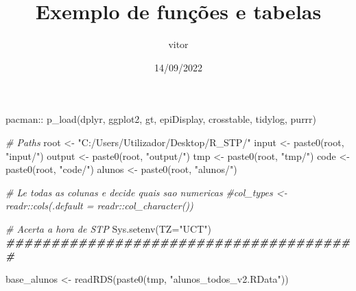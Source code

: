 \documentclass[
]{article}
\title{Exemplo de funções e tabelas}
\author{vitor}
\date{14/09/2022}
\newenvironment{Shaded}{\begin{snugshade}}{\end{snugshade}}
\newcommand{\AttributeTok}[1]{\textcolor[rgb]{0.77,0.63,0.00}{#1}}
\newcommand{\CommentTok}[1]{\textcolor[rgb]{0.56,0.35,0.01}{\textit{#1}}}
\newcommand{\DocumentationTok}[1]{\textcolor[rgb]{0.56,0.35,0.01}{\textbf{\textit{#1}}}}
\newcommand{\FunctionTok}[1]{\textcolor[rgb]{0.00,0.00,0.00}{#1}}
\newcommand{\NormalTok}[1]{#1}
\newcommand{\OtherTok}[1]{\textcolor[rgb]{0.56,0.35,0.01}{#1}}
\newcommand{\SpecialCharTok}[1]{\textcolor[rgb]{0.00,0.00,0.00}{#1}}
\newcommand{\StringTok}[1]{\textcolor[rgb]{0.31,0.60,0.02}{#1}}
\begin{document}
\maketitle

\begin{Shaded}
\begin{Highlighting}[]
\NormalTok{pacman}\SpecialCharTok{::} \FunctionTok{p\_load}\NormalTok{(dplyr, ggplot2, gt, epiDisplay, crosstable, tidylog, purrr)}

\CommentTok{\# Paths}
\NormalTok{root     }\OtherTok{\textless{}{-}}  \StringTok{"C:/Users/Utilizador/Desktop/R\_STP/"}
\NormalTok{input    }\OtherTok{\textless{}{-}} \FunctionTok{paste0}\NormalTok{(root, }\StringTok{"input/"}\NormalTok{)}
\NormalTok{output   }\OtherTok{\textless{}{-}} \FunctionTok{paste0}\NormalTok{(root, }\StringTok{"output/"}\NormalTok{)}
\NormalTok{tmp      }\OtherTok{\textless{}{-}} \FunctionTok{paste0}\NormalTok{(root, }\StringTok{"tmp/"}\NormalTok{)}
\NormalTok{code     }\OtherTok{\textless{}{-}} \FunctionTok{paste0}\NormalTok{(root, }\StringTok{"code/"}\NormalTok{)}
\NormalTok{alunos   }\OtherTok{\textless{}{-}} \FunctionTok{paste0}\NormalTok{(root, }\StringTok{"alunos/"}\NormalTok{)}

\CommentTok{\# Le todas as colunas e decide quais sao numericas}
\CommentTok{\#col\_types \textless{}{-} readr::cols(.default = readr::col\_character())}

\CommentTok{\# Acerta a hora de STP}
\FunctionTok{Sys.setenv}\NormalTok{(}\AttributeTok{TZ=}\StringTok{"UCT"}\NormalTok{)}
\DocumentationTok{\#\#\#\#\#\#\#\#\#\#\#\#\#\#\#\#\#\#\#\#\#\#\#\#\#\#\#\#\#\#\#\#\#\#\#\#\#\#\#}

\NormalTok{base\_alunos }\OtherTok{\textless{}{-}} \FunctionTok{readRDS}\NormalTok{(}\FunctionTok{paste0}\NormalTok{(tmp, }\StringTok{"alunos\_todos\_v2.RData"}\NormalTok{))}
\end{Highlighting}
\end{Shaded}
\end{document}
